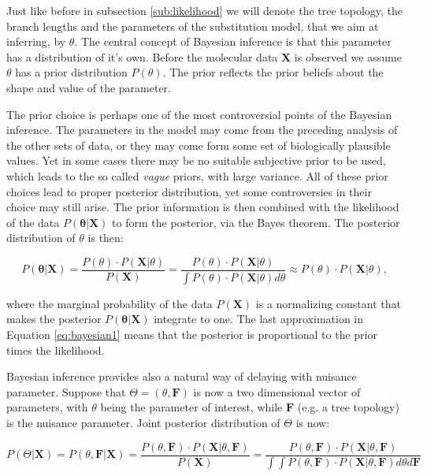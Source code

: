 \documentclass[12pt,twoside]{mitthesis}
\theoremstyle{plain}
\theoremstyle{definition}
\theoremstyle{remark}
\begin{document}
Just like before in subsection \ref{sub:likelihood} we will denote the tree topology, the branch lengths and the parameters of the substitution model, that we aim at inferring, by $\theta$.
The central concept of Bayesian inference is that this parameter has a distribution of it's own.
Before the molecular data $\mathbf{X}$ is observed we assume $\theta$ has a prior distribution $P(\theta)$.
The prior reflects the prior beliefs about the shape and value of the parameter.

The prior choice is perhaps one of the most controversial points of the Bayesian inference.
The parameters in the model may come from the preceding analysis of the other sets of data, or they may come form some set of biologically plausible values.
Yet in some cases there may be no suitable subjective prior to be used, which leads to the so called \emph{vague} priors, with large variance.
All of these prior choices lead to proper posterior distribution, yet some controversies in their choice may still arise.
The prior information is then combined with the likelihood of the data $P\left(\mathbf{\theta}|\mathbf{X}\right)$ to form the posterior, via the Bayes theorem.
The posterior distribution of $\theta$ is then:

\begin{equation}
P\left(\mathbf{\theta}|\mathbf{X}\right)=\frac{P(\theta)\cdot P\left(\mathbf{X}|\theta\right)}{P\left(\mathbf{X}\right)}=\frac{P(\theta)\cdot P\left(\mathbf{X}|\theta\right)}{\int P(\theta)\cdot P\left(\mathbf{X}|\theta\right)d\theta}\approx P(\theta)\cdot P\left(\mathbf{X}|\theta\right),
\label{eq:bayesian1}
\end{equation}

\noindent
where the marginal probability of the data $P\left(\mathbf{X}\right)$ is a normalizing constant that makes the posterior $P\left(\mathbf{\theta}|\mathbf{X}\right)$ integrate to one.
The last approximation in Equation \ref{eq:bayesian1} means that the posterior is proportional to the prior times the likelihood.

Bayesian inference provides also a natural way of delaying with nuisance parameter.
Suppose that $\Theta=\left(\theta,\mathbf{F}\right)$ is now a two dimensional vector of parameters, with $\theta$ being the parameter of interest, while 
$\mathbf{F}$ (e.g. a tree topology) is the nuisance parameter.
Joint posterior distribution of $\Theta$ is now:

\begin{equation}
P\left(\Theta|\mathbf{X}\right)=P\left(\theta,\mathbf{F}|\mathbf{X}\right)=\frac{P\left(\theta,\mathbf{F}\right)\cdot P\left(\mathbf{X}|\theta,\mathbf{F}\right)}{P\left(\mathbf{X}\right)}=\frac{P\left(\theta,\mathbf{F}\right)\cdot P\left(\mathbf{X}|\theta,\mathbf{F}\right)}{\int\int P(\theta,\mathbf{F})\cdot P\left(\mathbf{X}|\theta,\mathbf{F}\right)d\theta d\mathbf{F}}
\label{eq:bayesian2}
\end{equation}
\end{document}
